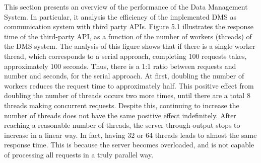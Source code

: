 This section presents an overview of the performance of the Data Management System. In particular, it
analysis the efficiency of the implemented DMS as communication system with third party APIs. Figure
5.1 illustrates the response time of the third-party API, as a function of the number of workers (threads)
of the DMS system.
The analysis of this figure shows that if there is a single worker thread, which corresponds to a
serial approach, completing 100 requests takes, approximately 100 seconds. Thus, there is a 1:1 ratio
between requests and number and seconds, for the serial approach. At first, doubling the number of
workers reduces the request time to approximately half. This positive effect from doubling the number of
threads occurs two more times, until there are a total 8 threads making concurrent requests.
Despite this, continuing to increase the number of threads does not have the same positive effect
indefinitely. After reaching a reasonable number of threads, the server through-output stops to increase
in a linear way. In fact, having 32 or 64 threads leads to almost the same response time. This is because
the server becomes overloaded, and is not capable of processing all requests in a truly parallel way.